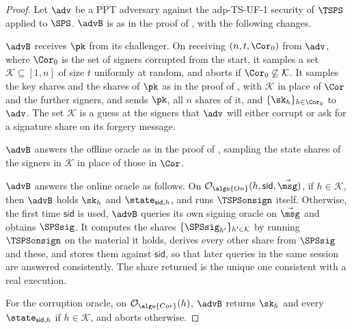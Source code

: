 \begin{proof}

  Let $\adv$ be a PPT adversary against the adp-TS-UF-1 security of $\TSPS$
applied to $\SPS$. $\advB$ is as in the proof of
, with the following changes.

  $\advB$ receives $\pk$ from its challenger. On receiving
$(n, t, \Cor_0)$ from $\adv$, where $\Cor_0$ is the set of signers corrupted
from the start, it samples a set $\mathcal{K} \subseteq [1,n]$ of
size $t$ uniformly at random, and aborts if $\Cor_0 \not\subseteq \mathcal{K}$.
It samples the key shares and the shares of $\pk$ as in the proof of
, with $\mathcal{K}$ in place of $\Cor$
and the further signers, and sends $\pk$, all $n$ shares of it, and $\{\sk_h\}_{h
\in \Cor_0}$ to $\adv$. The set $\mathcal{K}$ is a guess at the signers that $\adv$ will
either corrupt or ask for a signature share on its forgery message.

  $\advB$ answers the offline oracle as in the proof of
, sampling the state shares of the signers
in $\mathcal{K}$ in place of those in $\Cor$.

  $\advB$ answers the online oracle as follows. On $\mathcal{O}_{\algo{On}}(h, \mathsf{sid},
\vec{\msg})$, if $h \in \mathcal{K}$, then $\advB$ holds $\sk_h$ and
$\state_{\mathsf{sid},h}$, and runs $\TSPSonsign$ itself. Otherwise, the
first time $\mathsf{sid}$ is used, $\advB$ queries its own signing oracle on
$\vec{\msg}$ and obtains $\SPSsig$. It computes the shares
$\{\SPSsig_{h'}\}_{h' \in \mathcal{K}}$ by running $\TSPSonsign$ on the material it
holds, derives every other share from $\SPSsig$ and these, and stores them against $\mathsf{sid}$, so that later
queries in the same session are answered consistently. The share returned is the
unique one consistent with a real execution.

  For the corruption oracle, on $\mathcal{O}_{\algo{Cor}}(h)$, $\advB$
returns $\sk_h$ and every $\state_{\mathsf{sid},h}$ if $h \in \mathcal{K}$, and
aborts otherwise.


\end{proof}
